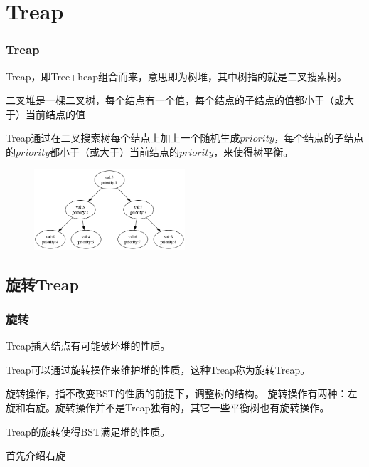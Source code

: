 \documentclass[utf8]{ctexbeamer}
\begin{document}
    \section{Treap}

    \begin{frame}
        \frametitle{Treap}
        Treap，即Tree+heap组合而来，意思即为树堆，其中树指的就是二叉搜索树。
        \begin{tcolorbox}[colframe=blue,title=二叉堆]
            二叉堆是一棵二叉树，每个结点有一个值，每个结点的子结点的值都小于（或大于）当前结点的值
        \end{tcolorbox}
        Treap通过在二叉搜索树每个结点上加上一个随机生成$priority$，每个结点的子结点的$priority$都小于（或大于）当前结点的$priority$，来使得树平衡。
        \begin{figure}
            \includegraphics[width=0.5\textwidth]{images/Treap.png}
        \end{figure}
    \end{frame}

    \subsection{旋转Treap}

    \begin{frame}
        \frametitle{旋转}
        Treap插入结点有可能破坏堆的性质。

        Treap可以通过旋转操作来维护堆的性质，这种Treap称为旋转Treap。
        
        旋转操作，指不改变BST的性质的前提下，调整树的结构。
        旋转操作有两种：左旋和右旋。旋转操作并不是Treap独有的，其它一些平衡树也有旋转操作。

        Treap的旋转使得BST满足堆的性质。 
        
        首先介绍右旋
    
    \end{frame}
\end{document}
